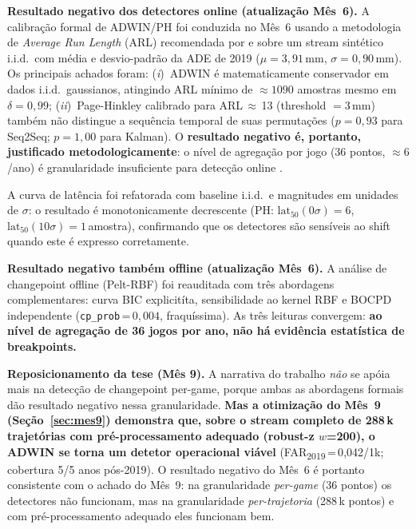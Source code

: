 \documentclass[11pt,a4paper]{article}
\begin{document}
\textbf{Resultado negativo dos detectores online (atualiza\c{c}\~ao M\^es~6).}
A calibra\c{c}\~ao formal de ADWIN/PH foi conduzida no M\^es~6 usando a
metodologia de \emph{Average Run Length} (ARL) recomendada por
\citet{mouss2004} e \citet{lu2019} sobre um stream sint\'etico
i.i.d.\ com m\'edia e desvio-padr\~ao da ADE de 2019
($\mu=3{,}91$\,mm, $\sigma=0{,}90$\,mm).
Os principais achados foram: (\textit{i})~ADWIN \'e matematicamente
conservador em dados i.i.d.\ gaussianos, atingindo ARL m\'inimo de
${\approx}1090$ amostras mesmo em $\delta\!=\!0{,}99$;
(\textit{ii})~Page-Hinkley calibrado para ARL\,$\approx$\,13
(threshold $=3\,\text{mm}$) tamb\'em n\~ao distingue a sequ\^encia
temporal de suas permuta\c{c}\~oes ($p\!=\!0{,}93$ para Seq2Seq;
$p\!=\!1{,}00$ para Kalman). O \textbf{resultado negativo \'e,
portanto, justificado metodologicamente}: o n\'ivel de agrega\c{c}\~ao
por jogo (36 pontos, ${\approx}6$/ano) \'e granularidade insuficiente
para detec\c{c}\~ao online \cite{gama2014}.

A curva de lat\^encia foi refatorada com baseline i.i.d.\ e magnitudes
em unidades de $\sigma$: o resultado \'e monotonicamente decrescente
(PH: $\text{lat}_{50}(0\sigma)=6$, $\text{lat}_{50}(10\sigma)=1$\,amostra),
confirmando que os detectores s\~ao sens\'iveis ao shift quando este
\'e expresso corretamente.

\textbf{Resultado negativo tamb\'em offline (atualiza\c{c}\~ao M\^es~6).}
A an\'alise de changepoint offline (Pelt-RBF) foi reauditada com
tr\^es abordagens complementares: curva BIC explicit\'ita, sensibilidade
ao kernel RBF e BOCPD independente \cite{adams2007}
(\texttt{cp\_prob}\,=\,$0{,}004$, fraqu\'issima). As tr\^es leituras
convergem: \textbf{ao n\'ivel de agrega\c{c}\~ao de 36 jogos por ano,
n\~ao h\'a evid\^encia estat\'istica de breakpoints.}

\textbf{Reposicionamento da tese (M\^es 9).}
A narrativa do trabalho \emph{n\~ao} se ap\'oia mais na detec\c{c}\~ao
de changepoint per-game, porque ambas as abordagens formais d\~ao
resultado negativo nessa granularidade. \textbf{Mas a otimiza\c{c}\~ao
do M\^es~9 (Se\c{c}\~ao~\ref{sec:mes9}) demonstra que, sobre o stream
completo de 288\,k trajet\'orias com pr\'e-processamento adequado
(robust-z $w$=200), o ADWIN se torna um detetor operacional vi\'avel}
(FAR\textsubscript{2019}\,=\,0{,}042/1k; cobertura 5/5 anos
p\'os-2019). O resultado negativo do M\^es~6 \'e portanto consistente
com o achado do M\^es~9: na granularidade \emph{per-game} (36 pontos)
os detectores n\~ao funcionam, mas na granularidade \emph{per-trajetoria}
(288\,k pontos) e com pr\'e-processamento adequado eles funcionam bem.
\end{document}
